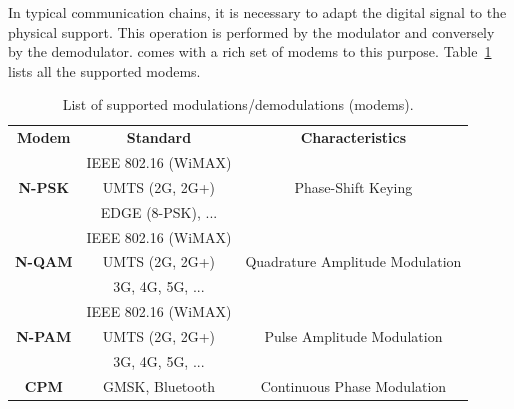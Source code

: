 In typical communication chains, it is necessary to adapt the digital signal
to the physical support. This operation is performed by the modulator and
conversely by the demodulator. \AFFECT comes with a rich set of modems to this
purpose. Table~\ref{tab:lib_modems} lists all the supported modems.

\begin{table}
  \centering
  \caption{List of supported modulations/demodulations (modems).}
  \label{tab:lib_modems}
  \begin{tabular}{ c | c | c }
  \multirow{2}{*}{\textbf{Modem}}        & \multirow{2}{*}{\textbf{Standard}} & \multirow{2}{*}{\textbf{Characteristics}} \\
                                         &                                    &                                           \\
  \hline
  \hline
  \multirow{3}{*}{\textbf{N-PSK}}        & IEEE 802.16 (WiMAX)                &                                           \\
                                         & UMTS (2G, 2G+)                     & Phase-Shift Keying                        \\
                                         & EDGE (8-PSK), ...                  &                                           \\
  \hline
  \multirow{3}{*}{\textbf{N-QAM}}        & IEEE 802.16 (WiMAX)                &                                           \\
                                         & UMTS (2G, 2G+)                     & Quadrature Amplitude Modulation           \\
                                         & 3G, 4G, 5G, ...                    &                                           \\
  \hline
  \multirow{3}{*}{\textbf{N-PAM}}        & IEEE 802.16 (WiMAX)                &                                           \\
                                         & UMTS (2G, 2G+)                     & Pulse Amplitude Modulation                \\
                                         & 3G, 4G, 5G, ...                    &                                           \\
  \hline
  \multirow{2}{*}{\textbf{CPM}}          & GMSK, Bluetooth                    & Continuous Phase Modulation               \\

\end{tabular}
\end{table}
